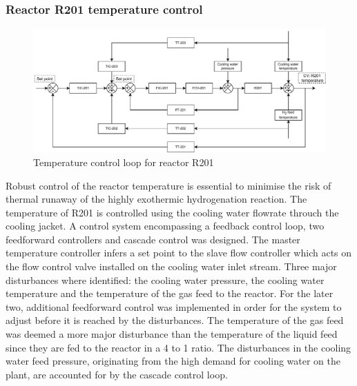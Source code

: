 \subsubsection{Reactor R201 temperature control} %
\begin{figure}
    \centering
    \includegraphics[width=\linewidth]{chapters/4-operation-control/4-Figures/R201-TC.pdf}
    \caption{Temperature control loop for reactor R201}
    \label{fig:R201-TC}
\end{figure}
Robust control of the reactor temperature is essential to minimise the risk of thermal runaway of the highly exothermic hydrogenation reaction. The temperature of R201 is controlled using the cooling water flowrate throuch the cooling jacket. A control system encompassing a feedback control loop, two feedforward controllers and cascade control was designed. The master temperature controller infers a set point to the slave flow controller which acts on the flow control valve installed on the cooling water inlet stream. Three major disturbances where identified: the cooling water pressure, the cooling water temperature and the temperature of the gas feed to the reactor. For the later two, additional feedforward control was implemented in order for the system to adjust before it is reached by the disturbances. The temperature of the gas feed was deemed a more major disturbance than the temperature of the liquid feed since they are fed to the reactor in a 4 to 1 ratio. The disturbances in the cooling water feed pressure, originating from the high demand for cooling water on the plant, are accounted for by the cascade control loop.



